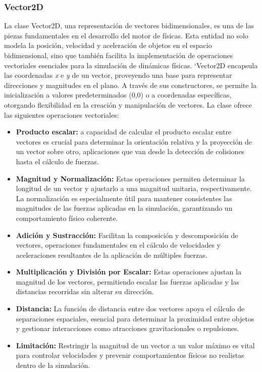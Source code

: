 \subsubsection{Vector2D}
La clase Vector2D, una representación de vectores bidimensionales, es una de las piezas fundamentales en el desarrollo del motor de físicas. Esta entidad no solo modela la posición, velocidad y aceleración de objetos en el espacio bidimensional, sino que también facilita la implementación de operaciones vectoriales esenciales para la simulación de dinámicas físicas.
`Vector2D encapsula las coordenadas \textit{x} e \textit{y} de un vector, proveyendo una base para representar direcciones y magnitudes en el plano. A través de sus constructores, se permite la inicialización a valores predeterminados (0,0) o a coordenadas específicas, otorgando flexibilidad en la creación y manipulación de vectores.
La clase ofrece las siguientes operaciones vectoriales:
\begin{itemize}
    \item \textbf{Producto escalar:} a capacidad de calcular el producto escalar entre vectores es crucial para determinar la orientación relativa y la proyección de un vector sobre otro, aplicaciones que van desde la detección de colisiones hasta el cálculo de fuerzas.
    \item \textbf{Magnitud y Normalización:} Estas operaciones permiten determinar la longitud de un vector y ajustarlo a una magnitud unitaria, respectivamente. La normalización es especialmente útil para mantener consistentes las magnitudes de las fuerzas aplicadas en la simulación, garantizando un comportamiento físico coherente.
    \item \textbf{Adición y Sustracción:} Facilitan la composición y descomposición de vectores, operaciones fundamentales en el cálculo de velocidades y aceleraciones resultantes de la aplicación de múltiples fuerzas.
    \item \textbf{Multiplicación y División por Escalar:} Estas operaciones ajustan la magnitud de los vectores, permitiendo escalar las fuerzas aplicadas y las distancias recorridas sin alterar su dirección.
    \item \textbf{Distancia:} La función de distancia entre dos vectores apoya el cálculo de separaciones espaciales, esencial para determinar la proximidad entre objetos y gestionar interacciones como atracciones gravitacionales o repulsiones.
    \item \textbf{Limitación:} Restringir la magnitud de un vector a un valor máximo es vital para controlar velocidades y prevenir comportamientos físicos no realistas dentro de la simulación.
\end{itemize}
